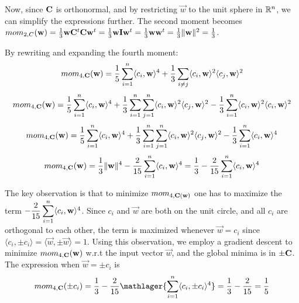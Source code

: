 Now, since $\mathbf{C}$ is orthonormal, and by restricting $\vec{w}$ to the unit sphere in $\mathbb{R}^n$, we can simplify the expressions further.
The second moment becomes $mom_{2, C}(\mathbf{w}) = \frac{1}{3} \mathbf{w} \mathbf{C}^t \mathbf{C} \mathbf{w}^t = \frac{1}{3}\mathbf{w} \mathbf{I} \mathbf{w}^t 
= \frac{1}{3} \mathbf{w}\mathbf{w}^t = \frac{1}{3} \lVert \mathbf{w} \rVert ^2 = \frac{1}{3}$. 

By rewriting and expanding the fourth moment:
\[ mom_{4, \mathbf{C}} (\mathbf{w}) = \frac{1}{5} \sum_{i=1}^{n} \langle c_i, \mathbf{w} \rangle ^4 + \frac{1}{3} \sum_{i \neq j} \langle c_i, \mathbf{w} \rangle ^2 \langle c_j, \mathbf{w} \rangle ^2\]
\[ mom_{4, \mathbf{C}} (\mathbf{w}) = \frac{1}{5} \sum_{i=1}^{n} \langle c_i, \mathbf{w} \rangle ^4 + 
    \frac{1}{3} \sum_{i=1}^{n} \sum_{j=1}^n \langle c_i, \mathbf{w} \rangle ^2 \langle c_j, \mathbf{w} \rangle ^2 -
\frac{1}{3}\sum_{i=1}^{n} \langle c_i, \mathbf{w} \rangle ^2 \langle c_i, \mathbf{w} \rangle ^2\]
\[ mom_{4, \mathbf{C}} (\mathbf{w}) = \frac{1}{5} \sum_{i=1}^{n} \langle c_i, \mathbf{w} \rangle ^4 + 
\frac{1}{3} \sum_{i=1}^n \sum_{j=1}^n \langle c_i, \mathbf{w} \rangle ^2 \langle c_j, \mathbf{w} \rangle ^2 -
\frac{1}{3}\sum_{i=1}^{n} \langle c_i, \mathbf{w} \rangle ^4 \]
\[ mom_{4, \mathbf{C}} (\mathbf{w}) = \frac{1}{3} \lVert \mathbf{w} \rVert ^4 - 
    \frac{2}{15}\sum_{i=1}^{n} \langle c_i, \mathbf{w} \rangle ^4 = \frac{1}{3} - 
\frac{2}{15}\sum_{i=1}^n \langle c_i, \mathbf{w} \rangle ^4\]


The key observation is that to minimize $mom_{4, \mathbf{C}(\mathbf{w})}$ one has to maximize the term 
$ \mathlarger{-\frac{2}{15}\sum_{i=1}^{n}} \langle c_i, \vec{w} \rangle ^4$. Since $c_i$ and $\vec{w}$ are both on the unit circle, and
all $c_i$ are orthogonal to each other, the term is maximized whenever $\vec{w} = c_i$ since $\langle c_i, \pm c_i \rangle = \langle \vec{w}, \pm \vec{w} \rangle = 1$.
Using this observation, we employ a gradient descent to minimize $mom_{4, \mathbf{C}}(\mathbf{w})$ w.r.t the input vector $\vec{w}$, and the global minima is in $\pm \mathbf{C}$.
The expression when $\vec{w} = \pm c_i$ is 
\[
    mom_{4, \mat{C}}(\pm c_i) = \frac{1}{3} - \frac{2}{15} \mathlager{\sum_{i=1}^{n} \langle c_i, \pm c_i \rangle ^4}
    = \frac{1}{3} - \frac{2}{15} = \frac{1}{5}
\]

